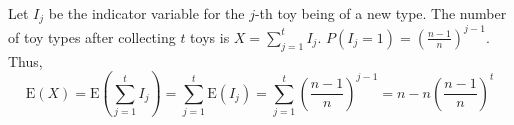 Let $I_{j}$ be the indicator variable for the $j$-th toy being of a new type.
The number of toy types after collecting $t$ toys is $X = \sum_{j=1}^{t}I_{j}$.
$P(I_{j}=1) = (\frac{n-1}{n})^{j-1}$. Thus, $$\text{E}(X) = \text{E}(\sum_{j=1}^
{t}I_{j}) = \sum_{j=1}^{t}\text{E}(I_{j}) = \sum_{j=1}^{t}(\frac{n-1}{n})^{j-1}
= n - n(\frac{n-1}{n})^{t}$$